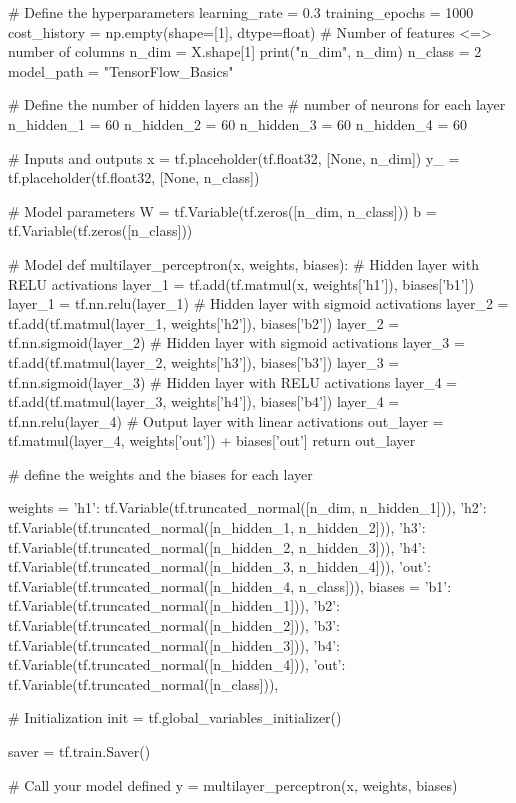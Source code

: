 \documentclass[11pt]{article}
\begin{document}
\begin{python}
# Define the hyperparameters
learning_rate = 0.3
training_epochs = 1000
cost_history = np.empty(shape=[1], dtype=float)
# Number of features <=> number of columns
n_dim = X.shape[1]
print("n_dim", n_dim)
n_class = 2
model_path = "TensorFlow_Basics"

# Define the number of hidden layers an the
# number of neurons for each layer
n_hidden_1 = 60
n_hidden_2 = 60
n_hidden_3 = 60
n_hidden_4 = 60

# Inputs and outputs
x = tf.placeholder(tf.float32, [None, n_dim])
y_ = tf.placeholder(tf.float32, [None, n_class])

# Model parameters
W = tf.Variable(tf.zeros([n_dim, n_class]))
b = tf.Variable(tf.zeros([n_class]))


# Model
def multilayer_perceptron(x, weights, biases):
    # Hidden layer with RELU activations
    layer_1 = tf.add(tf.matmul(x, weights['h1']), biases['b1'])
    layer_1 = tf.nn.relu(layer_1)
    # Hidden layer with sigmoid activations
    layer_2 = tf.add(tf.matmul(layer_1, weights['h2']), biases['b2'])
    layer_2 = tf.nn.sigmoid(layer_2)
    # Hidden layer with sigmoid activations
    layer_3 = tf.add(tf.matmul(layer_2, weights['h3']), biases['b3'])
    layer_3 = tf.nn.sigmoid(layer_3)
    # Hidden layer with RELU activations
    layer_4 = tf.add(tf.matmul(layer_3, weights['h4']), biases['b4'])
    layer_4 = tf.nn.relu(layer_4)
    # Output layer with linear activations
    out_layer = tf.matmul(layer_4, weights['out']) + biases['out']
    return out_layer


# define the weights and the biases for each layer

weights = {
    'h1': tf.Variable(tf.truncated_normal([n_dim, n_hidden_1])),
    'h2': tf.Variable(tf.truncated_normal([n_hidden_1, n_hidden_2])),
    'h3': tf.Variable(tf.truncated_normal([n_hidden_2, n_hidden_3])),
    'h4': tf.Variable(tf.truncated_normal([n_hidden_3, n_hidden_4])),
    'out': tf.Variable(tf.truncated_normal([n_hidden_4, n_class])),
}
biases = {
    'b1': tf.Variable(tf.truncated_normal([n_hidden_1])),
    'b2': tf.Variable(tf.truncated_normal([n_hidden_2])),
    'b3': tf.Variable(tf.truncated_normal([n_hidden_3])),
    'b4': tf.Variable(tf.truncated_normal([n_hidden_4])),
    'out': tf.Variable(tf.truncated_normal([n_class])),
}

# Initialization
init = tf.global_variables_initializer()

saver = tf.train.Saver()

# Call your model defined
y = multilayer_perceptron(x, weights, biases)


\end{python}
\end{document}
